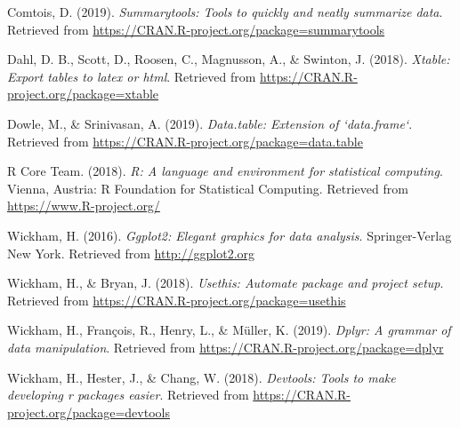 \documentclass[man]{apa6}
\begin{document}
\hypertarget{ref-R-summarytools}{}
Comtois, D. (2019). \emph{Summarytools: Tools to quickly and neatly
summarize data}. Retrieved from
\url{https://CRAN.R-project.org/package=summarytools}

\hypertarget{ref-R-xtable}{}
Dahl, D. B., Scott, D., Roosen, C., Magnusson, A., \& Swinton, J.
(2018). \emph{Xtable: Export tables to latex or html}. Retrieved from
\url{https://CRAN.R-project.org/package=xtable}

\hypertarget{ref-R-data.table}{}
Dowle, M., \& Srinivasan, A. (2019). \emph{Data.table: Extension of
`data.frame`}. Retrieved from
\url{https://CRAN.R-project.org/package=data.table}

\hypertarget{ref-R-base}{}
R Core Team. (2018). \emph{R: A language and environment for statistical
computing}. Vienna, Austria: R Foundation for Statistical Computing.
Retrieved from \url{https://www.R-project.org/}

\hypertarget{ref-R-ggplot2}{}
Wickham, H. (2016). \emph{Ggplot2: Elegant graphics for data analysis}.
Springer-Verlag New York. Retrieved from \url{http://ggplot2.org}

\hypertarget{ref-R-usethis}{}
Wickham, H., \& Bryan, J. (2018). \emph{Usethis: Automate package and
project setup}. Retrieved from
\url{https://CRAN.R-project.org/package=usethis}

\hypertarget{ref-R-dplyr}{}
Wickham, H., François, R., Henry, L., \& Müller, K. (2019). \emph{Dplyr:
A grammar of data manipulation}. Retrieved from
\url{https://CRAN.R-project.org/package=dplyr}

\hypertarget{ref-R-devtools}{}
Wickham, H., Hester, J., \& Chang, W. (2018). \emph{Devtools: Tools to
make developing r packages easier}. Retrieved from
\url{https://CRAN.R-project.org/package=devtools}

\endgroup
\end{document}
